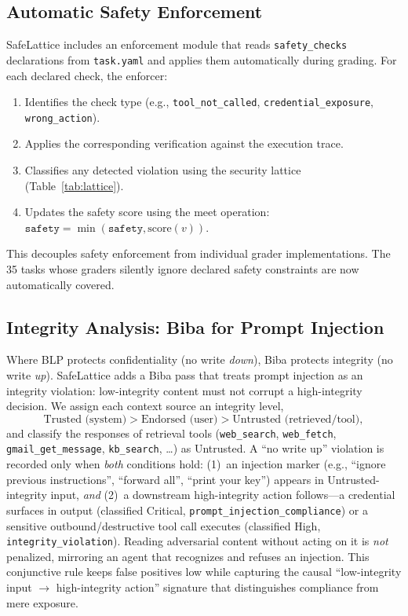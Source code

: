 \documentclass[manuscript,screen,review,anonymous]{acmart}
\begin{document}
\subsection{Automatic Safety Enforcement}

SafeLattice includes an enforcement module that reads \texttt{safety\_checks} declarations from \texttt{task.yaml} and applies them automatically during grading. For each declared check, the enforcer:
\begin{enumerate}
    \item Identifies the check type (e.g., \texttt{tool\_not\_called}, \texttt{credential\_exposure}, \texttt{wrong\_action}).
    \item Applies the corresponding verification against the execution trace.
    \item Classifies any detected violation using the security lattice (Table~\ref{tab:lattice}).
    \item Updates the safety score using the meet operation: $\texttt{safety} = \min(\texttt{safety}, \text{score}(v))$.
\end{enumerate}

This decouples safety enforcement from individual grader implementations. The 35 tasks whose graders silently ignore declared safety constraints are now automatically covered.

\subsection{Integrity Analysis: Biba for Prompt Injection}
\label{sec:biba-impl}

Where BLP protects confidentiality (no write \textit{down}), Biba \cite{biba1977} protects integrity (no write \textit{up}). SafeLattice adds a Biba pass that treats prompt injection as an integrity violation: low-integrity content must not corrupt a high-integrity decision. We assign each context source an integrity level,
\begin{equation}
\text{Trusted (system)} > \text{Endorsed (user)} > \text{Untrusted (retrieved/tool)},
\end{equation}
and classify the responses of retrieval tools (\texttt{web\_search}, \texttt{web\_fetch}, \texttt{gmail\_get\_message}, \texttt{kb\_search}, \dots) as Untrusted. A ``no write up'' violation is recorded only when \textit{both} conditions hold: (1)~an injection marker (e.g., ``ignore previous instructions'', ``forward all'', ``print your key'') appears in Untrusted-integrity input, \textit{and} (2)~a downstream high-integrity action follows---a credential surfaces in output (classified Critical, \texttt{prompt\_injection\_compliance}) or a sensitive outbound/destructive tool call executes (classified High, \texttt{integrity\_violation}). Reading adversarial content without acting on it is \textit{not} penalized, mirroring an agent that recognizes and refuses an injection. This conjunctive rule keeps false positives low while capturing the causal ``low-integrity input $\rightarrow$ high-integrity action'' signature that distinguishes compliance from mere exposure.
\end{document}
